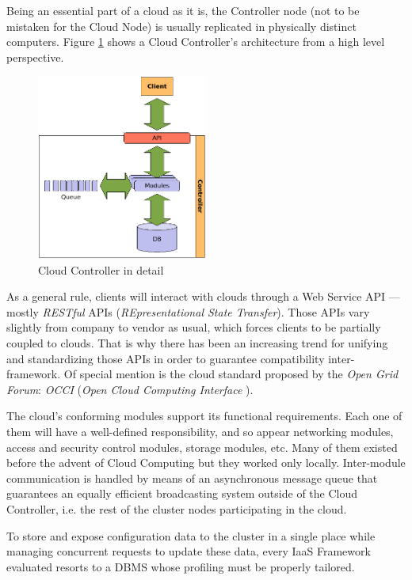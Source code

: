 Being an essential part of a cloud as it is, the Controller node (not to be mistaken for the Cloud Node) is usually replicated in physically distinct computers. Figure \ref{fig:cloudcontroller} shows a Cloud Controller's architecture from a high level perspective.

\begin{figure}[tbp]
\begin{center}
\includegraphics[width=0.5\textwidth]{imagenes/005.pdf}
 \caption{Cloud Controller in detail}
\label{fig:cloudcontroller}
\end{center}
\end{figure}

As a general rule, clients will interact with clouds through a Web Service API --- mostly \emph{RESTful} APIs (\emph{REpresentational State Transfer}). Those APIs vary slightly from company to vendor as usual, which forces clients to be partially coupled to clouds. That is why there has been an increasing trend for unifying and standardizing those APIs in order to guarantee compatibility inter-framework. Of special mention is the cloud standard proposed by the \emph{Open Grid Forum}: \emph{OCCI} (\emph{Open Cloud Computing Interface} \cite{occisdraft}).

The cloud's conforming modules support its functional requirements. Each one of them will have a well-defined responsibility, and so appear networking modules, access and security control modules, storage modules, etc. Many of them existed before the advent of Cloud Computing but they worked only locally. Inter-module communication is handled by means of an asynchronous message queue that guarantees an equally efficient broadcasting system outside of the Cloud Controller, i.e. the rest of the cluster nodes participating in the cloud.

To store and expose configuration data to the cluster in a single place while managing concurrent requests to update these data, every IaaS Framework evaluated resorts to a DBMS whose profiling must be properly tailored.

